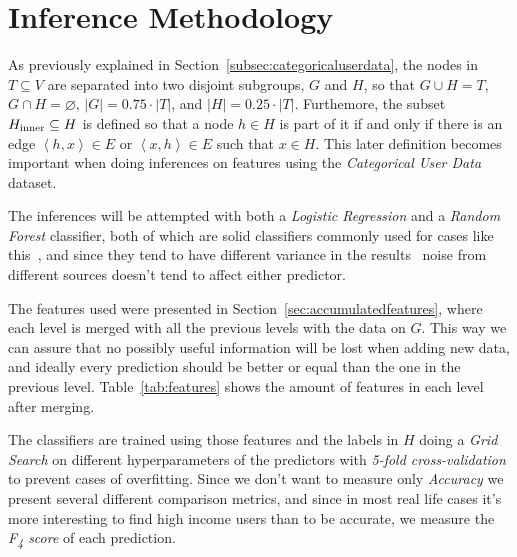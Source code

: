 \section{Inference Methodology}
\label{sec:inference_methodology}

As previously explained in Section~\ref{subsec:categoricaluserdata}, the nodes in $T \subseteq V$ are separated into two disjoint subgroups, $G$ and $H$, so that $G \cup H = T$, $G \cap H = \varnothing$, $\left| G \right| = 0.75 \cdot \left| T \right|$, and $\left| H \right| = 0.25 \cdot \left| T \right|$. Furthemore, the subset $H_{\operatorname{inner}} \subseteq H$ is defined so that a node $h \in H$ is part of it if and only if there is an edge $\left< h, x \right> \in E$ or $\left< x, h \right> \in E$ such that $x \in H$\footnotemark{}. This later definition becomes important when doing inferences on features using the \emph{Categorical User Data} dataset.


The inferences will be attempted with both a \emph{Logistic Regression} and a \emph{Random Forest} classifier, both of which are solid classifiers commonly used for cases like this~\cite{binaryevaluation}, and since they tend to have different variance in the results~\cite{ting2016} noise from different sources doesn't tend to affect either predictor.

The features used were presented in Section~\ref{sec:accumulatedfeatures}, where each level is merged with all the previous levels with the data on $G$. This way we can assure that no possibly useful information will be lost when adding new data, and ideally every prediction should be better or equal than the one in the previous level. Table~\ref{tab:features} shows the amount of features in each level after merging.

The classifiers are trained using those features and the labels in $H$ doing a \emph{Grid Search} on different hyperparameters of the predictors with \emph{5-fold cross-validation} to prevent cases of overfitting. Since we don't want to measure only \emph{Accuracy} we present several different comparison metrics, and since in most real life cases it's more interesting to find high income users than to be accurate\footnotemark{}, we measure the \emph{F\textsubscript{4} score} of each prediction.


